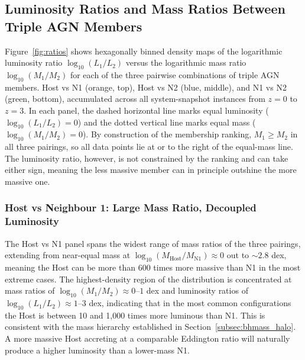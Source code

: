 \documentclass[twocolumn, 10pt]{article}
\begin{document}
\subsection{Luminosity Ratios and Mass Ratios Between Triple AGN Members}
\label{subsec:ratios}
 
Figure~\ref{fig:ratios} shows hexagonally binned density maps of the logarithmic luminosity ratio $\log_{10}(L_1/L_2)$ versus the logarithmic mass ratio $\log_{10}(M_1/M_2)$ for each of the three pairwise combinations of triple AGN members. Host vs N1 (orange, top), Host vs N2 (blue, middle), and N1 vs N2 (green, bottom), accumulated across all system-snapshot instances from $z = 0$ to $z = 3$. In each panel, the dashed horizontal line marks equal luminosity ($\log_{10}(L_1/L_2) = 0$) and the dotted vertical line marks equal mass ($\log_{10}(M_1/M_2) = 0$). By construction of the membership ranking, $M_1 \geq M_2$ in all three pairings, so all data points lie at or to the right of the equal-mass line. The luminosity ratio, however, is not constrained by the ranking and can take either sign, meaning the less massive member can in principle outshine the more massive one.
 
\subsubsection{Host vs Neighbour 1: Large Mass Ratio, Decoupled Luminosity}
\label{subsubsec:ratio_hostn1}
 
The Host vs N1 panel spans the widest range of mass ratios of the three pairings, extending from near-equal mass at $\log_{10}(M_\mathrm{Host}/M_\mathrm{N1}) \approx 0$ out to $\sim 2.8$ dex, meaning the Host can be more than 600 times more massive than N1 in the most extreme cases. The highest-density region of the distribution is concentrated at mass ratios of $\log_{10}(M_1/M_2) \approx 0$--$1$ dex and luminosity ratios of $\log_{10}(L_1/L_2) \approx 1$--$3$ dex, indicating that in the most common configurations the Host is between 10 and 1,000 times more luminous than N1. This is consistent with the mass hierarchy established in Section~\ref{subsec:bhmass_halo}. A more massive Host accreting at a comparable Eddington ratio will naturally produce a higher luminosity than a lower-mass N1.
 
\end{document}
